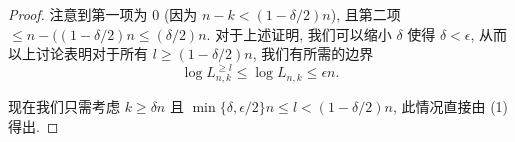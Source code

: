 \begin{proof}
注意到第一项为 $0$ (因为 $n-k < (1-\delta/2)n$), 且第二项 $\le n-((1-\delta/2)n \le (\delta/2)n$.
对于上述证明, 我们可以缩小 $\delta$ 使得 $\delta < \epsilon$, 从而以上讨论表明对于所有 $l \ge (1-\delta/2)n$, 我们有所需的边界
\[ \log L_{n,k}^{\geq l} \le \log L_{n,k} \le \epsilon n. \]

现在我们只需考虑 $k \ge \delta n$ 且 $\min\{\delta, \epsilon/2\}n \le l < (1 - \delta/2)n$, 此情况直接由 (1) 得出.
\end{proof}
